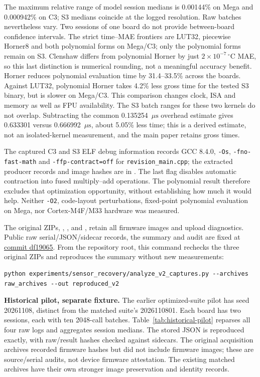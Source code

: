 \documentclass[10pt,letterpaper]{article}
\newcommand{\degC}{\ensuremath{^{\circ}\mathrm{C}}}
\newcommand{\us}{\ensuremath{\mu\mathrm{s}}}
\begin{document}
The maximum relative range of model session medians is 0.00144\% on Mega and 0.000942\% on C3; S3 medians coincide at the logged resolution. Raw batches nevertheless vary. Two sessions of one board do not provide between-board confidence intervals. The strict time--MAE frontiers are LUT32, piecewise Horner8 and both polynomial forms on Mega/C3; only the polynomial forms remain on S3. Clenshaw differs from polynomial Horner by just $2\times10^{-7}\,\degC$ MAE, so this last distinction is numerical rounding, not a meaningful accuracy benefit. Horner reduces polynomial evaluation time by 31.4--33.5\% across the boards. Against LUT32, polynomial Horner takes 4.2\% less gross time for the tested S3 binary, but is slower on Mega/C3. This comparison changes clock, ISA and memory as well as FPU availability. The S3 batch ranges for these two kernels do not overlap. Subtracting the common 0.135254~\us{} overhead estimate gives 0.633301 versus 0.666992~\us{}, about 5.05\% less time; this is a derived estimate, not an isolated-kernel measurement, and the main paper retains gross times.

The captured C3 and S3 ELF debug information records GCC 8.4.0, \texttt{-Os}, \texttt{-fno-fast-math} and \texttt{-ffp-contract=off} for \texttt{revision\_main.cpp}; the extracted producer records and image hashes are in . The last flag disables automatic contraction into fused multiply--add operations. The polynomial result therefore excludes that optimization opportunity, without establishing how much it would help. Neither \texttt{-O2}, code-layout perturbations, fixed-point polynomial evaluation on Mega, nor Cortex-M4F/M33 hardware was measured.

The original ZIPs, , , and , retain all firmware images and upload diagnostics. Public raw serial/JSON/sidecar records, the summary and audit are fixed at \href{https://github.com/KuznetsovKarazin/lut-kan-native/tree/df1906500c609bf8eabe41862432f79475548ba9/experiments/sensor_recovery/results/v2_boards_20261109}{commit df19065}. From the repository root, this command rechecks the three original ZIPs and reproduces the summary without new measurements:
\begin{lstlisting}
python experiments/sensor_recovery/analyze_v2_captures.py --archives raw_archives --out reproduced_v2
\end{lstlisting}

\textbf{Historical pilot, separate fixture.}
The earlier optimized-suite pilot has seed 20261108, distinct from the matched suite's 2026110801. Each board has two sessions, each with ten 2048-call batches. Table~\ref{tab:historical-pilot} reparses all four raw logs and aggregates session medians. The stored JSON is reproduced exactly, with raw/result hashes checked against sidecars. The original acquisition archives recorded firmware hashes but did not include firmware images; these are source/serial audits, not device firmware attestation. The existing matched archives have their own stronger image preservation and identity records.
\end{document}
